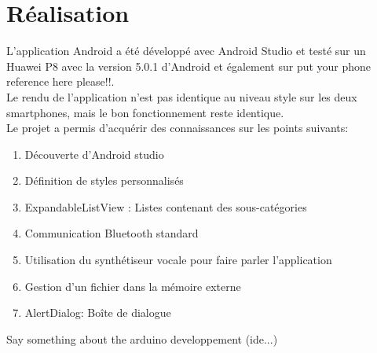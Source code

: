 \section{Réalisation}
L'application Android a été développé avec Android Studio et testé sur un Huawei P8 avec la version 5.0.1 d'Android et également sur \color{red} put your phone reference here please!!.\color{black}\\ Le rendu de l'application n'est pas identique au niveau style sur les deux smartphones, mais le bon fonctionnement reste identique.\\
Le projet a permis d'acquérir des connaissances sur les points suivants:
\begin{enumerate}
	\item Découverte d'Android studio
	\item Définition de styles personnalisés
	\item ExpandableListView : Listes contenant des sous-catégories
	\item Communication Bluetooth standard
	\item Utilisation du synthétiseur vocale pour faire parler l'application
	\item Gestion d'un fichier dans la mémoire externe
	\item AlertDialog: Boîte de dialogue\\
\end{enumerate}

\color{red} Say something about the arduino developpement (ide...)\color{black}
